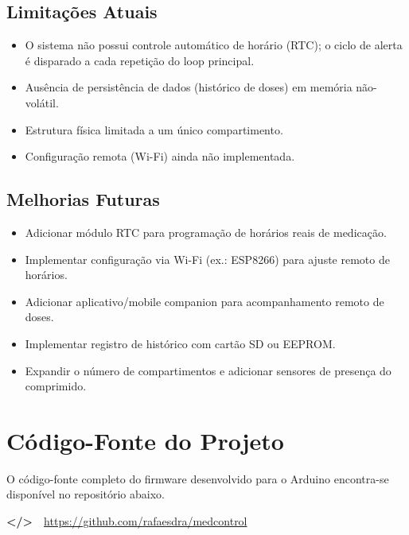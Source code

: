 \documentclass[11pt,a4paper]{article}
\newcommand{\iGit}{\textbf{\textcolor{mcTealDark}{\textless/\textgreater}}}
\begin{document}
\subsection{Limitações Atuais}
\begin{itemize}[leftmargin=1.4em, itemsep=2pt]
  \item O sistema não possui controle automático de horário (RTC); o ciclo de alerta é disparado a cada repetição do loop principal.
  \item Ausência de persistência de dados (histórico de doses) em memória não-volátil.
  \item Estrutura física limitada a um único compartimento.
  \item Configuração remota (Wi-Fi) ainda não implementada.
\end{itemize}

\subsection{Melhorias Futuras}
\begin{itemize}[leftmargin=1.4em, itemsep=2pt]
  \item Adicionar módulo RTC para programação de horários reais de medicação.
  \item Implementar configuração via Wi-Fi (ex.: ESP8266) para ajuste remoto de horários.
  \item Adicionar aplicativo/mobile companion para acompanhamento remoto de doses.
  \item Implementar registro de histórico com cartão SD ou EEPROM.
  \item Expandir o número de compartimentos e adicionar sensores de presença do comprimido.
\end{itemize}

\FloatBarrier
\newpage
\section{Código-Fonte do Projeto}

O código-fonte completo do firmware desenvolvido para o Arduino encontra-se disponível no repositório abaixo.

\begin{specbox}[Repositório]
\iGit\ \ \url{https://github.com/rafaesdra/medcontrol} 
\end{specbox}
\end{document}
